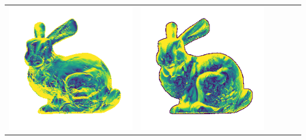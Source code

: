 \begin{tabularx}{\linewidth}{@{}Y@{}Y@{}Y@{}Y@{}Y@{}Y@{}}
\includegraphics[width=\linewidth]{semisynthetic/20160617_14_yu_err.png} &
\includegraphics[width=\linewidth]{semisynthetic/20160617_14_dpsn_err.png} &

\end{tabularx}
